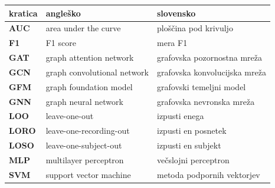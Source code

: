 \begin{tabular}{p{}|p{}|p{}}
  {\bf kratica} & {\bf angleško} & {\bf slovensko} \\ \hline
  {\bf AUC} & area under the curve & ploščina pod krivuljo \\
  {\bf F1} & F1 score & mera F1 \\
  {\bf GAT} & graph attention network & grafovska pozornostna mreža \\
  {\bf GCN} & graph convolutional network & grafovska konvolucijska mreža \\
  {\bf GFM} & graph foundation model & grafovski temeljni model \\
  {\bf GNN} & graph neural network & grafovska nevronska mreža \\
  {\bf LOO} & leave-one-out & izpusti enega \\
  {\bf LORO} & leave-one-recording-out & izpusti en posnetek \\
  {\bf LOSO} & leave-one-subject-out & izpusti en subjekt \\
  {\bf MLP} & multilayer perceptron & večslojni perceptron \\
  {\bf SVM} & support vector machine & metoda podpornih vektorjev \\
\end{tabular}
